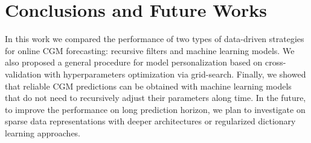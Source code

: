 \section{Conclusions and Future Works}

In this work we compared the performance of two types of data-driven strategies for online CGM forecasting: recursive filters and machine learning models. We also proposed a general procedure for model personalization based on cross-validation with hyperparameters optimization via grid-search.
Finally, we showed that reliable CGM predictions can be obtained with machine learning models that do not need to recursively adjust their parameters along time.
In the future, to improve the performance on long prediction horizon, we plan to investigate on sparse data representations with deeper architectures or regularized dictionary learning approaches.
